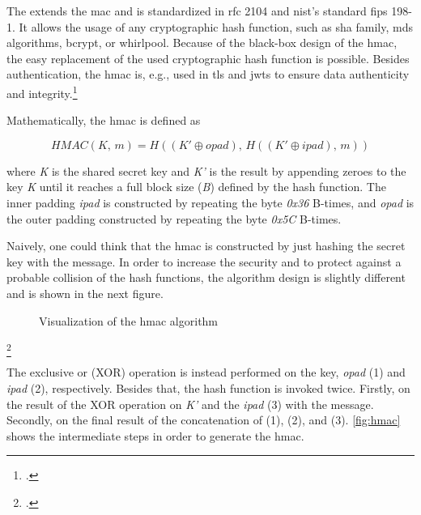 The  extends the \gls{mac} and is standardized in \gls{rfc} 2104 and \gls{nist}'s standard \gls{fips} 198-1. It allows the usage of any cryptographic hash function, such as \gls{sha} family, \glspl{md} algorithms, bcrypt, or whirlpool. Because of the black-box design of the \gls{hmac}, the easy replacement of the used cryptographic hash function is possible. Besides authentication, the \gls{hmac} is, e.g., used in \gls{tls} and \glspl{jwt} to ensure data authenticity and integrity.\footcites[See][]{krawczyk1997rfc}[See][]{FIPS198}[See][14]{rfc5246}[See][8]{rfc7519}[See][3--4]{s2011rfc}

Mathematically, the \gls{hmac} is defined as

\begin{equation*}
	HMAC(K,\, m) = H((K' \oplus opad),\, H((K' \oplus ipad),\, m))
\end{equation*}

where \textit{K} is the shared secret key and \textit{K'} is the result by appending zeroes to the key \textit{K} until it reaches a full block size (\textit{B}) defined by the hash function. The inner padding \textit{ipad} is constructed by repeating the byte \textit{0x36} B-times, and \textit{opad} is the outer padding constructed by repeating the byte \textit{0x5C} B-times.

Naively, one could think that the \gls{hmac} is constructed by just hashing the secret key with the message. In order to increase the security and to protect against a probable collision of the hash functions, the algorithm design is slightly different and is shown in the next figure.

\begin{figure}[hbt]
	\centering
	
	\caption[Visualization of the \gls{hmac} algorithm]{Visualization of the \gls{hmac} algorithm\footnotemark}
	\label{fig:hmac}
\end{figure}
\footcitetext[Source: diagram by author, based on][395]{eckert-it-sec-9}

The exclusive or (XOR) operation is instead performed on the key, \textit{opad} (1) and \textit{ipad} (2), respectively. Besides that, the hash function is invoked twice. Firstly, on the result of the XOR operation on \textit{K'} and the \textit{ipad} (3) with the message. Secondly, on the final result of the concatenation of (1), (2), and (3). \autoref{fig:hmac} shows the intermediate steps in order to generate the \gls{hmac}.

